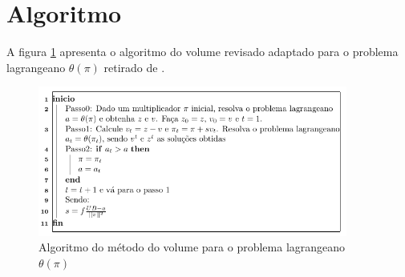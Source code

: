 \section{Algoritmo}\label{sec:algoritmo} 
A figura \ref{AlgoritmoVolume} apresenta o algoritmo do volume revisado adaptado para o problema lagrangeano
$ \theta (\pi)$ retirado de \cite{Barahona91}. 
\begin{figure}
\centering
\includegraphics[width=4in]{AlgoritmoVolume.png}
\caption{Algoritmo do método do volume para o problema lagrangeano $ \theta (\pi)$}
\label{AlgoritmoVolume}
\end{figure}